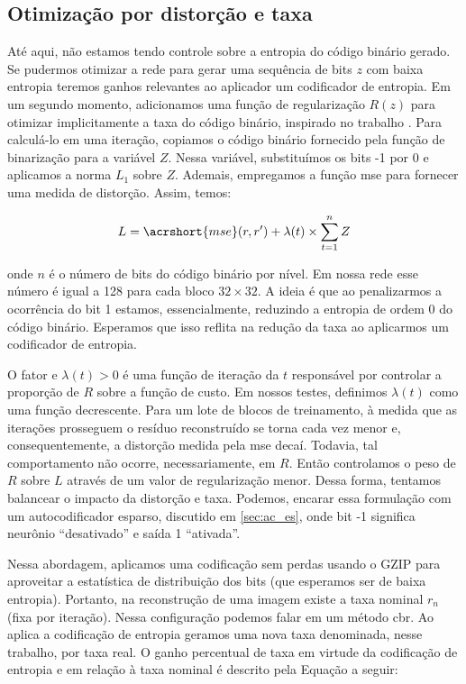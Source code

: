 \subsection{Otimização por distorção e taxa}

Até aqui, não estamos tendo controle sobre a entropia do código binário gerado. Se pudermos otimizar a rede para gerar uma sequência de bits $z$ com baixa entropia teremos ganhos relevantes ao aplicador um codificador de entropia. Em um segundo momento, adicionamos uma função de regularização $R(z)$ para otimizar implicitamente a taxa do código binário, inspirado no trabalho \cite{zhao1901cae}. 
Para calculá-lo em uma iteração, copiamos o código binário fornecido pela função de binarização  para a variável $Z$. Nessa variável, substituímos os bits -1 por 0 e aplicamos a norma $L_1$ sobre $Z$. Ademais, empregamos a função \acrshort{mse} para fornecer uma medida de distorção. Assim, temos:

\begin{equation}
\label{eq:rdo}
L = \acrshort{mse}(r,r') + \lambda(t) \times \sum_{t=1}^{n} Z 
\end{equation}


onde $n$ é o número de bits do código binário por nível. Em nossa rede esse número é igual a 128 para cada bloco $32 \times 32$. A ideia é que ao penalizarmos a ocorrência do bit 1 estamos, essencialmente, reduzindo a entropia de ordem 0 do código binário. Esperamos que isso reflita na redução da taxa ao aplicarmos um codificador de entropia.   

O fator e $\lambda(t)>0$ é uma função de iteração da $t$ responsável por controlar a proporção de $R$ sobre a função de custo. Em nossos testes, definimos $\lambda(t)$ como uma função decrescente. Para um lote de blocos de treinamento, à medida que as iterações prosseguem o resíduo reconstruído se torna cada vez menor e, consequentemente, a distorção medida pela \acrshort{mse} decaí. Todavia, tal comportamento não ocorre, necessariamente, em $R$. Então controlamos o peso de $R$ sobre  $L$ através de um valor de regularização menor. Dessa forma, tentamos balancear o impacto da distorção e taxa. Podemos, encarar essa formulação com um autocodificador esparso, discutido em \ref{sec:ac_es}, onde bit -1 significa neurônio ``desativado'' e saída 1 ``ativada''. 

Nessa abordagem, aplicamos uma codificação sem perdas usando o GZIP para aproveitar a estatística de distribuição dos bits (que esperamos ser de baixa entropia). Portanto, na reconstrução de uma imagem existe a taxa nominal $r_n$ (fixa por iteração). Nessa configuração podemos falar em um método \gls{cbr}. Ao aplica a codificação de entropia geramos uma nova taxa denominada, nesse trabalho, por taxa real.  O ganho percentual de taxa em virtude da codificação de entropia e em relação à taxa nominal é descrito pela Equação a seguir:

